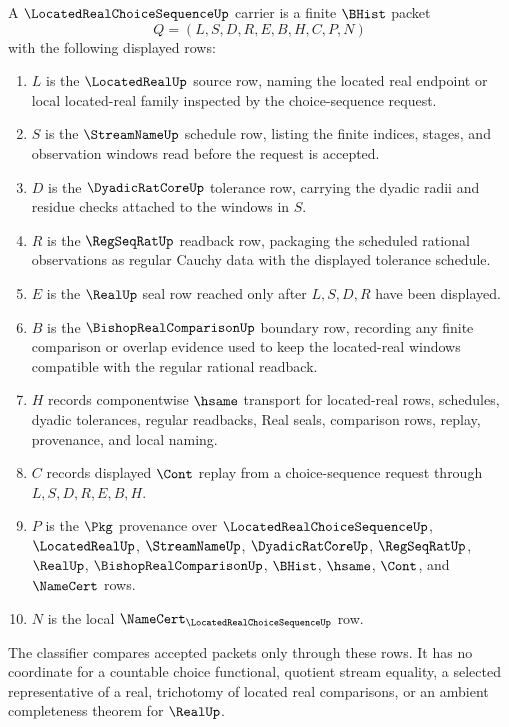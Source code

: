 \begin{definition}
\label{def:located-real-choice-sequence-carrier}
A $\LocatedRealChoiceSequenceUp$ carrier is a finite $\BHist$ packet
$$
Q=(L,S,D,R,E,B,H,C,P,N)
$$
with the following displayed rows:
\begin{enumerate}
\item $L$ is the $\LocatedRealUp$ source row, naming the located real endpoint or local located-real family inspected by the choice-sequence request.
\item $S$ is the $\StreamNameUp$ schedule row, listing the finite indices, stages, and observation windows read before the request is accepted.
\item $D$ is the $\DyadicRatCoreUp$ tolerance row, carrying the dyadic radii and residue checks attached to the windows in $S$.
\item $R$ is the $\RegSeqRatUp$ readback row, packaging the scheduled rational observations as regular Cauchy data with the displayed tolerance schedule.
\item $E$ is the $\RealUp$ seal row reached only after $L,S,D,R$ have been displayed.
\item $B$ is the $\BishopRealComparisonUp$ boundary row, recording any finite comparison or overlap evidence used to keep the located-real windows compatible with the regular rational readback.
\item $H$ records componentwise $\hsame$ transport for located-real rows, schedules, dyadic tolerances, regular readbacks, Real seals, comparison rows, replay, provenance, and local naming.
\item $C$ records displayed $\Cont$ replay from a choice-sequence request through $L,S,D,R,E,B,H$.
\item $P$ is the $\Pkg$ provenance over $\LocatedRealChoiceSequenceUp$, $\LocatedRealUp$, $\StreamNameUp$, $\DyadicRatCoreUp$, $\RegSeqRatUp$, $\RealUp$, $\BishopRealComparisonUp$, $\BHist$, $\hsame$, $\Cont$, and $\NameCert$ rows.
\item $N$ is the local $\NameCert_{\LocatedRealChoiceSequenceUp}$ row.
\end{enumerate}
The classifier compares accepted packets only through these rows. It has no coordinate for a countable choice functional, quotient stream equality, a selected representative of a real, trichotomy of located real comparisons, or an ambient completeness theorem for $\RealUp$.
\end{definition}

